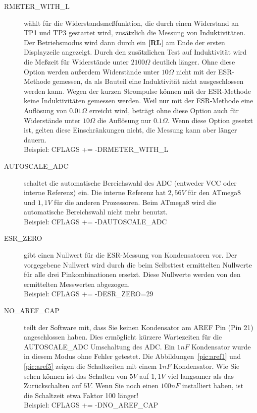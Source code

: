 \begin{description}
  \item[RMETER\_WITH\_L] wählt für die Widerstandsmeßfunktion, die durch einen Widerstand an TP1 und TP3 gestartet wird,
zusätzlich die Messung von Induktivitäten. Der Betriebsmodus wird dann durch ein {\bf[RL]} am Ende der ersten Displayzeile
angezeigt. Durch den zusätzlichen Test auf Induktivität wird die Meßzeit für Widerstände unter \(2100\Omega\) deutlich
länger. Ohne diese Option werden außerdem Widerstände unter \(10\Omega\) nicht mit der ESR-Methode gemessen,
da als Bauteil eine Induktivität nicht ausgeschlossen werden kann.
Wegen der kurzen Strompulse können mit der ESR-Methode keine Induktivitäten gemessen werden.
Weil nur mit der ESR-Methode eine Auflösung von \(0.01\Omega\) erreicht wird, beträgt ohne diese Option auch für 
Widerstände unter \(10\Omega\) die Auflösung nur \(0.1\Omega\).
Wenn diese Option gesetzt ist, gelten diese Einschränkungen nicht, die Messung kann aber länger dauern.\\
Beispiel: CFLAGS += -DRMETER\_WITH\_L

  \item[AUTOSCALE\_ADC] schaltet die automatische Bereichswahl des ADC (entweder VCC oder interne Referenz) ein.
Die interne Referenz hat \(2,56V\) für den ATmega8 und \(1,1V\) für die anderen Prozessoren.
Beim ATmega8 wird die automatische Bereichswahl nicht mehr benutzt.\\
Beispiel: CFLAGS += -DAUTOSCALE\_ADC

  \item[ESR\_ZERO] gibt einen Nullwert für die ESR-Messung von Kondensatoren vor.
Der vorgegebene Nullwert wird durch die beim Selbsttest ermittelten Nullwerte für alle drei Pinkombinationen ersetzt.
 Diese Nullwerte werden von den ermittelten Messwerten abgezogen.\\
Beispiel: CFLAGS += -DESR\_ZERO=29

  \item[NO\_AREF\_CAP] teilt der Software mit, dass Sie keinen Kondensator am AREF Pin (Pin 21) angeschlossen haben.
Dies ermöglicht kürzere Wartezeiten für die AUTOSCALE\_ADC Umschaltung des ADC.
Ein \(1nF\) Kondensator wurde in diesem Modus ohne Fehler getestet.
Die Abbildungen~\ref{pic:aref1} und \ref{pic:aref5} zeigen die Schaltzeiten mit einem \(1nF\) Kondensator.
Wie Sie sehen können ist das Schalten von \(5V\) auf \(1,1V\) viel langsamer als das Zurückschalten auf \(5V\).
Wenn Sie noch einen \(100nF\) installiert haben, ist die Schaltzeit etwa Faktor 100 länger!\\
Beispiel: CFLAGS += -DNO\_AREF\_CAP

\end{description}

